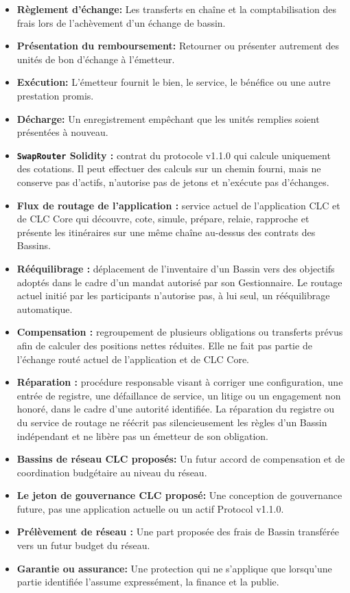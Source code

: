 \documentclass[11pt]{article}
\begin{document}
\begin{itemize}[leftmargin=*]
\item \textbf{Règlement d'échange:} Les transferts en chaîne et la comptabilisation des frais lors de l'achèvement d'un échange de bassin.
\item \textbf{Présentation du remboursement:} Retourner ou présenter autrement des unités de bon d'échange à l'émetteur.
\item \textbf{Exécution:} L'émetteur fournit le bien, le service, le bénéfice ou une autre prestation promis.
\item \textbf{Décharge:} Un enregistrement empêchant que les unités remplies soient présentées à nouveau.
\item \textbf{\texttt{SwapRouter} Solidity :} contrat du protocole v1.1.0 qui calcule uniquement des cotations. Il peut effectuer des calculs sur un chemin fourni, mais ne conserve pas d'actifs, n'autorise pas de jetons et n'exécute pas d'échanges.
\item \textbf{Flux de routage de l'application :} service actuel de l'application CLC et de CLC Core qui découvre, cote, simule, prépare, relaie, rapproche et présente les itinéraires sur une même chaîne au-dessus des contrats des Bassins.
\item \textbf{Rééquilibrage :} déplacement de l'inventaire d'un Bassin vers des objectifs adoptés dans le cadre d'un mandat autorisé par son Gestionnaire. Le routage actuel initié par les participants n'autorise pas, à lui seul, un rééquilibrage automatique.
\item \textbf{Compensation :} regroupement de plusieurs obligations ou transferts prévus afin de calculer des positions nettes réduites. Elle ne fait pas partie de l'échange routé actuel de l'application et de CLC Core.
\item \textbf{Réparation :} procédure responsable visant à corriger une configuration, une entrée de registre, une défaillance de service, un litige ou un engagement non honoré, dans le cadre d'une autorité identifiée. La réparation du registre ou du service de routage ne réécrit pas silencieusement les règles d'un Bassin indépendant et ne libère pas un émetteur de son obligation.
\item \textbf{Bassins de réseau CLC proposés:} Un futur accord de compensation et de coordination budgétaire au niveau du réseau.
\item \textbf{Le jeton de gouvernance CLC proposé:} Une conception de gouvernance future, pas une application actuelle ou un actif Protocol v1.1.0.
\item \textbf{Prélèvement de réseau :} Une part proposée des frais de Bassin transférée vers un futur budget du réseau.
\item \textbf{Garantie ou assurance:} Une protection qui ne s'applique que lorsqu'une partie identifiée l'assume expressément, la finance et la publie.
\end{itemize}
\end{document}
